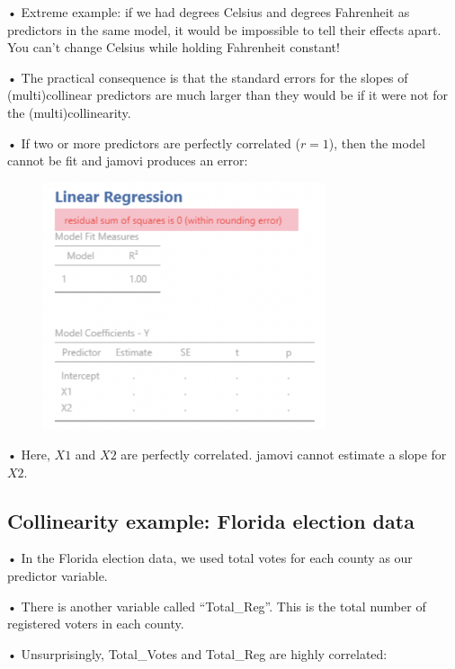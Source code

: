 \documentclass[
  letterpaper,
  DIV=11,
  numbers=noendperiod]{scrreprt}
\begin{document}
• Extreme example: if we had degrees Celsius and degrees Fahrenheit as
predictors in the same model, it would be impossible to tell their
effects apart. You can't change Celsius while holding Fahrenheit
constant!

• The practical consequence is that the standard errors for the slopes
of (multi)collinear predictors are much larger than they would be if it
were not for the (multi)collinearity.

• If two or more predictors are perfectly correlated (\(r=1\)), then the
model cannot be fit and jamovi produces an error:

\begin{figure}

{\centering \includegraphics[width=3.27083in,height=\textheight]{images/mod4_pt1_23.png}

}

\end{figure}

• Here, \(X1\) and \(X2\) are perfectly correlated. jamovi cannot
estimate a slope for \(X2\).

\hypertarget{collinearity-example-florida-election-data}{%
\subsection{Collinearity example: Florida election
data}\label{collinearity-example-florida-election-data}}

• In the Florida election data, we used total votes for each county as
our predictor variable.

• There is another variable called ``Total\_Reg''. This is the total
number of registered voters in each county.

• Unsurprisingly, Total\_Votes and Total\_Reg are highly correlated:
\end{document}
